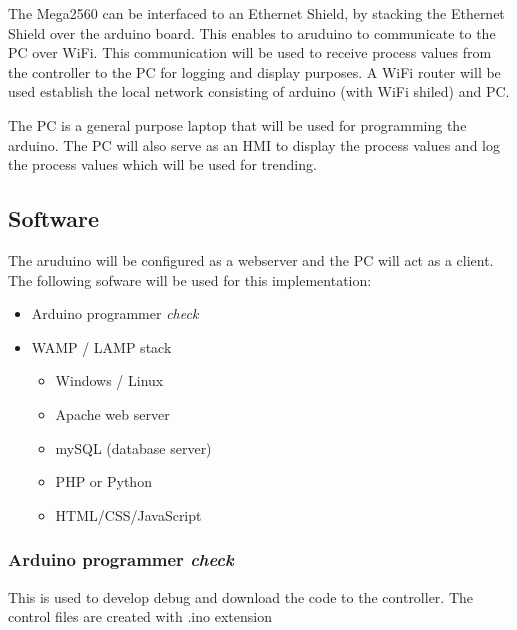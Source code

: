 \documentclass[a4paper,oneside]{article}
\begin{document}
The Mega2560 can be interfaced to an Ethernet Shield, by stacking the
Ethernet Shield over the arduino board. This enables to aruduino to
communicate to the PC over WiFi. This communication will be used to
receive process values from the controller to the PC for logging and
display purposes.  A WiFi router will be used establish the local
network consisting of arduino (with WiFi shiled) and PC.

The PC is a general purpose laptop that will be used for programming
the arduino. The PC will also serve as an HMI to display the process
values and log the process values which will be used for trending.

\subsection{Software}
\label{sec:org1cc2662}
The aruduino will be configured as a webserver and the PC will act as
a client. The following sofware will be used for this implementation:
\begin{itemize}
\item Arduino programmer \emph{\emph{check}}
\item WAMP / LAMP stack
\begin{itemize}
\item Windows / Linux
\item Apache web server
\item mySQL (database server)
\item PHP or Python
\item HTML/CSS/JavaScript
\end{itemize}
\end{itemize}

\subsubsection{Arduino programmer \emph{\emph{check}}}
\label{sec:org12b928f}
This is used to develop debug and download the code to the
controller. The control files are created with .ino extension
\end{document}

